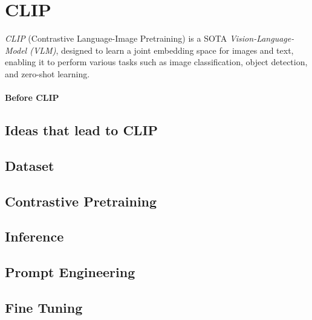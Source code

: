 \section{CLIP}
\textit{CLIP} (Contrastive Language-Image Pretraining) is a SOTA \textit{Vision-Language-Model (VLM)}, designed to learn a joint embedding space for images and text, 
enabling it to perform various tasks such as image classification, object detection, and zero-shot learning.

\paragraph{Before CLIP}

\subsection{Ideas that lead to CLIP}

\subsection{Dataset}

\subsection{Contrastive Pretraining}

\subsection{Inference}

\subsection{Prompt Engineering}

\subsection{Fine Tuning}
